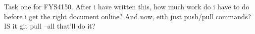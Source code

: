\documentclass{article}
\begin{document}
Task one for FYS4150. After i have written this, how much work do i have to do before i get the right document online? And now, eith just push/pull commands?
IS it git pull --all that'll do it?
\end{document}
